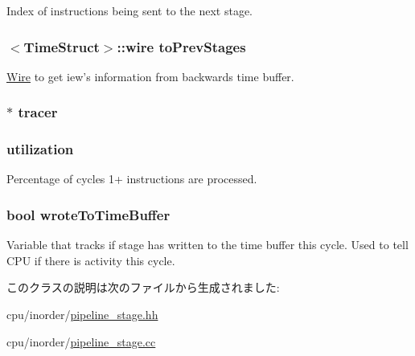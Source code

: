 \label{classPipelineStage_ab6a826f43ca871b277e724aa148d1816}
Index of instructions being sent to the next stage. \hypertarget{classPipelineStage_ad270a1de154f2e748a16880469c9baea}{
\subsubsection[{toPrevStages}]{$<${\bf TimeStruct}$>$::wire {\bf toPrevStages}}}
\label{classPipelineStage_ad270a1de154f2e748a16880469c9baea}
\hyperlink{classWire}{Wire} to get iew's information from backwards time buffer. \hypertarget{classPipelineStage_af3ad9be2b464186b902b5ca568b6d439}{
\subsubsection[{tracer}]{$\ast$ {\bf tracer}}}
\label{classPipelineStage_af3ad9be2b464186b902b5ca568b6d439}
\hypertarget{classPipelineStage_a04353589e0e920909d3ceb8e73abb7ac}{
\subsubsection[{utilization}]{ {\bf utilization}}}
\label{classPipelineStage_a04353589e0e920909d3ceb8e73abb7ac}
Percentage of cycles 1+ instructions are processed. \hypertarget{classPipelineStage_a2c7e870d4babdac0dc91fc7ffabd0f3d}{
\subsubsection[{wroteToTimeBuffer}]{\setlength{\rightskip}{0pt plus 5cm}bool {\bf wroteToTimeBuffer}}}
\label{classPipelineStage_a2c7e870d4babdac0dc91fc7ffabd0f3d}
Variable that tracks if stage has written to the time buffer this cycle. Used to tell CPU if there is activity this cycle. 

このクラスの説明は次のファイルから生成されました:\begin{DoxyCompactItemize}
\item 
cpu/inorder/\hyperlink{pipeline__stage_8hh}{pipeline\_\-stage.hh}\item 
cpu/inorder/\hyperlink{pipeline__stage_8cc}{pipeline\_\-stage.cc}\end{DoxyCompactItemize}
